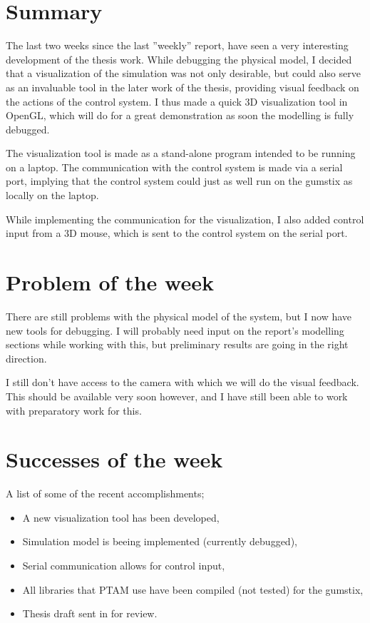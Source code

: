 \section{Summary}
The last two weeks since the last ''weekly'' report, have seen a very interesting
development of the thesis work. While debugging the physical model, I decided
that a visualization of the simulation was not only desirable, but could also
serve as an invaluable tool in the later work of the thesis, providing visual
feedback on the actions of the control system.
I thus made a quick 3D visualization tool in OpenGL, which will do for a great demonstration
as soon the modelling is fully debugged.

The visualization tool is made as a stand-alone program intended to be running
on a laptop. The communication with the control system is made via a serial port,
implying that the control system could just as well run on the gumstix as locally on the laptop.

While implementing the communication for the visualization, I also added
control input from a 3D mouse, which is sent to the control system on the serial port.

\section{Problem of the week}
There are still problems with the physical model of the system, but I now
have new tools for debugging. I will probably need input on the report's
modelling sections while working with this, but preliminary results are
going in the right direction.

I still don't have access to the camera with which we will do the visual feedback.
This should be available very soon however, and I have still been able to
work with preparatory work for this.

\section{Successes of the week}
A list of some of the recent accomplishments;
\begin{itemize}
    \item A new visualization tool has been developed,
    \item Simulation model is beeing implemented (currently debugged),
    \item Serial communication allows for control input,
    \item All libraries that PTAM use have been compiled (not tested) for the gumstix,
    \item Thesis draft sent in for review.
\end{itemize}

